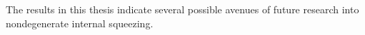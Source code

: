 
The results in this thesis indicate several possible avenues of future research into nondegenerate internal squeezing. %



